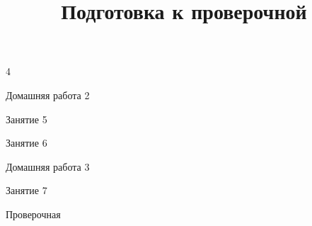 \begin{class}[number=4]
	\begin{listofex}
		\item 4
		
	\end{listofex}
\end{class}

\begin{homework}[number=2]
	\begin{listofex}
		\item Домашняя работа 2
	\end{listofex}
\end{homework}

\begin{class}[number=5]
	\begin{listofex}
		\item Занятие 5
	\end{listofex}
\end{class}

\begin{class}[number=6]
	\begin{listofex}
		\item Занятие 6
	\end{listofex}
\end{class}

\begin{homework}[number=3]
	\begin{listofex}
		\item Домашняя работа 3
	\end{listofex}
\end{homework}

\begin{class}[number=7]
	\title{Подготовка к проверочной}
	\begin{listofex}
		\item Занятие 7
	\end{listofex}
\end{class}

\begin{exam}
	\begin{listofex}
		\item Проверочная
	\end{listofex}
\end{exam}
